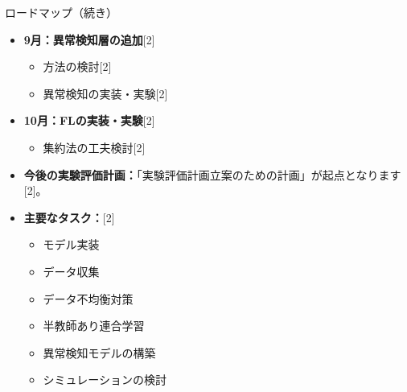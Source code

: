 \documentclass[unicode,12pt,aspectratio=169,dvipdfmx]{beamer}
\begin{document}
\begin{frame}{ロードマップ（続き）} %
    \begin{itemize}
        \item \textbf{9月：異常検知層の追加}[2]
        \begin{itemize}
            \item 方法の検討[2]
            \item 異常検知の実装・実験[2]
        \end{itemize}
        \item \textbf{10月：FLの実装・実験}[2]
        \begin{itemize}
            \item 集約法の工夫検討[2]
        \end{itemize}
        \item \textbf{今後の実験評価計画：}「実験評価計画立案のための計画」が起点となります[2]。
        \item \textbf{主要なタスク：}[2]
        \begin{itemize}
            \item モデル実装
            \item データ収集
            \item データ不均衡対策
            \item 半教師あり連合学習
            \item 異常検知モデルの構築
            \item シミュレーションの検討
        \end{itemize}
    \end{itemize}
\end{frame}

\end{document}
